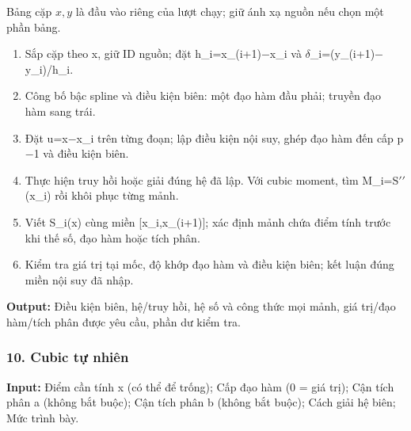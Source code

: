 Bảng cặp $x,y$ là đầu vào riêng của lượt chạy; giữ ánh xạ nguồn nếu chọn một phần bảng.

\begin{enumerate}

\item Sắp cặp theo x,\allowbreak{} giữ ID nguồn;\allowbreak{} đặt h\_i=\allowbreak{}x\_(\allowbreak{}i+\allowbreak{}1)\ensuremath{-}x\_i và \ensuremath{\delta}\_i=\allowbreak{}(\allowbreak{}y\_(\allowbreak{}i+\allowbreak{}1)\ensuremath{-}y\_i)/\allowbreak{}h\_i.

\item Công bố bậc spline và điều kiện biên: một đạo hàm đầu phải;\allowbreak{} truyền đạo hàm sang trái.

\item Đặt u=\allowbreak{}x\ensuremath{-}x\_i trên từng đoạn;\allowbreak{} lập điều kiện nội suy,\allowbreak{} ghép đạo hàm đến cấp p\ensuremath{-}1 và điều kiện biên.

\item Thực hiện truy hồi hoặc giải đúng hệ đã lập. Với cubic moment,\allowbreak{} tìm M\_i=\allowbreak{}S\ensuremath{\prime\prime}(\allowbreak{}x\_i) rồi khôi phục từng mảnh.

\item Viết S\_i(\allowbreak{}x) cùng miền [x\_i,\allowbreak{}x\_(\allowbreak{}i+\allowbreak{}1)];\allowbreak{} xác định mảnh chứa điểm tính trước khi thế số,\allowbreak{} đạo hàm hoặc tích phân.

\item Kiểm tra giá trị tại mốc,\allowbreak{} độ khớp đạo hàm và điều kiện biên;\allowbreak{} kết luận đúng miền nội suy đã nhập.

\end{enumerate}

\textbf{Output:} Điều kiện biên,\allowbreak{} hệ/\allowbreak{}truy hồi,\allowbreak{} hệ số và công thức mọi mảnh,\allowbreak{} giá trị/\allowbreak{}đạo hàm/\allowbreak{}tích phân được yêu cầu,\allowbreak{} phần dư kiểm tra.

\examplebreak\subsubsection*{10. Cubic tự nhiên}

\textbf{Input:} Điểm cần tính x (\allowbreak{}có thể để trống);\allowbreak{} Cấp đạo hàm (\allowbreak{}0 =\allowbreak{} giá trị);\allowbreak{} Cận tích phân a (\allowbreak{}không bắt buộc);\allowbreak{} Cận tích phân b (\allowbreak{}không bắt buộc);\allowbreak{} Cách giải hệ biên;\allowbreak{} Mức trình bày.

